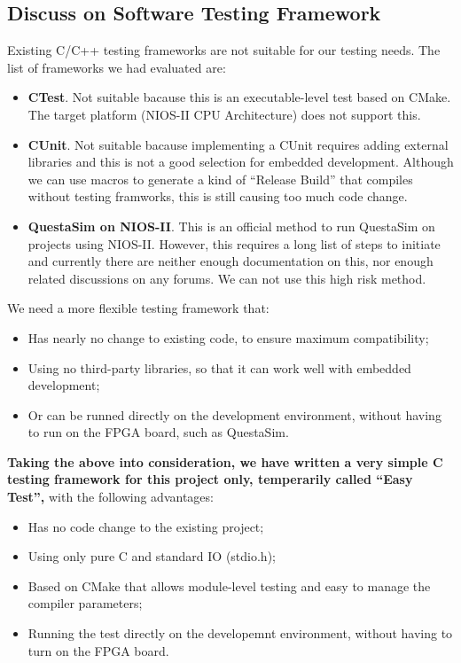 \documentclass[conference]{IEEEtran}
\begin{document}
\subsection{Discuss on Software Testing Framework}
Existing C/C++ testing frameworks are not suitable for our testing needs. The list of frameworks we had evaluated are:
\begin{itemize}
    \item \textbf{CTest}. Not suitable bacause this is an executable-level test based on CMake. The target platform (NIOS-II CPU Architecture) does not support this.
    \item \textbf{CUnit}. Not suitable bacause implementing a CUnit requires adding external libraries and this is not a good selection for embedded development. Although we can use macros to generate a kind of ``Release Build'' that compiles without testing framworks, this is still causing too much code change.
    \item \textbf{QuestaSim on NIOS-II}. This is an official method to run QuestaSim on projects using NIOS-II. However, this requires a long list of steps to initiate and currently there are neither enough documentation on this, nor enough related discussions on any forums. We can not use this high risk method.
\end{itemize}

We need a more flexible testing framework that:
\begin{itemize}
    \item Has nearly no change to existing code, to ensure maximum compatibility;
    \item Using no third-party libraries, so that it can work well with embedded development;
    \item Or can be runned directly on the development environment, without having to run on the FPGA board, such as QuestaSim.
\end{itemize}

\textbf{Taking the above into consideration, we have written a very simple C testing framework for this project only, temperarily called ``Easy Test'',} with the following advantages:

\begin{itemize}
    \item Has no code change to the existing project;
    \item Using only pure C and standard IO (stdio.h);
    \item Based on CMake that allows module-level testing and easy to manage the compiler parameters;
    \item Running the test directly on the developemnt environment, without having to turn on the FPGA board.
\end{itemize}
\end{document}
